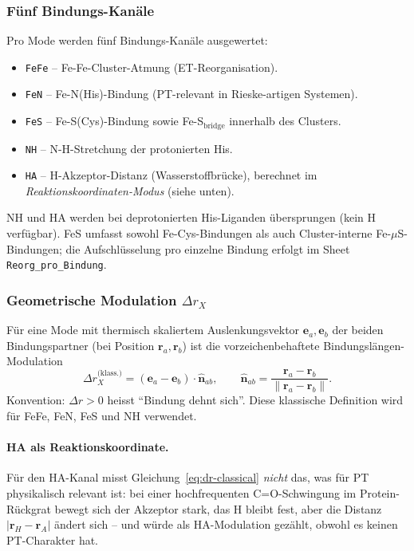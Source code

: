 \documentclass[11pt,a4paper,twoside]{article}
\theoremstyle{remark}
\begin{document}
\subsubsection*{F\"unf Bindungs-Kan\"ale}

Pro Mode werden f\"unf Bindungs-Kan\"ale ausgewertet:

\begin{itemize}\setlength{\itemsep}{0pt}
  \item \texttt{FeFe} -- Fe-Fe-Cluster-Atmung (ET-Reorganisation).
  \item \texttt{FeN} -- Fe-N(His)-Bindung (PT-relevant in
        Rieske-artigen Systemen).
  \item \texttt{FeS} -- Fe-S(Cys)-Bindung sowie Fe-S$_\text{bridge}$
        innerhalb des Clusters.
  \item \texttt{NH} -- N-H-Stretchung der protonierten His.
  \item \texttt{HA} -- H-Akzeptor-Distanz (Wasserstoffbr\"ucke), berechnet
        im \emph{Reaktionskoordinaten-Modus} (siehe unten).
\end{itemize}

NH und HA werden bei deprotonierten His-Liganden \"ubersprungen
(kein H verf\"ugbar). FeS umfasst sowohl Fe-Cys-Bindungen als auch
Cluster-interne Fe-$\mu$S-Bindungen; die Aufschl\"usselung pro einzelne
Bindung erfolgt im Sheet \texttt{Reorg\_pro\_Bindung}.

\subsubsection*{Geometrische Modulation $\Delta r_X$}

F\"ur eine Mode mit thermisch skaliertem Auslenkungsvektor
$\mathbf{e}_a, \mathbf{e}_b$ der beiden Bindungspartner (bei
Position $\mathbf{r}_a, \mathbf{r}_b$) ist die vorzeichenbehaftete
Bindungsl\"angen-Modulation
\begin{equation}
  \Delta r_X^\text{(klass.)}
  = (\mathbf{e}_a - \mathbf{e}_b) \cdot \hat{\mathbf{n}}_{ab},
  \qquad
  \hat{\mathbf{n}}_{ab} = \frac{\mathbf{r}_a - \mathbf{r}_b}{\|\mathbf{r}_a - \mathbf{r}_b\|}.
  \label{eq:dr-classical}
\end{equation}
Konvention: $\Delta r > 0$ heisst "`Bindung dehnt sich"'.
Diese klassische Definition wird f\"ur FeFe, FeN, FeS und NH verwendet.

\paragraph{HA als Reaktionskoordinate.}
F\"ur den HA-Kanal misst Gleichung~\ref{eq:dr-classical} \emph{nicht}
das, was f\"ur PT physikalisch relevant ist: bei einer hochfrequenten
C=O-Schwingung im Protein-R\"uckgrat bewegt sich der Akzeptor stark,
das H bleibt fest, aber die Distanz $|\mathbf{r}_H - \mathbf{r}_A|$
\"andert sich -- und w\"urde als HA-Modulation gez\"ahlt, obwohl es
keinen PT-Charakter hat.
\end{document}
